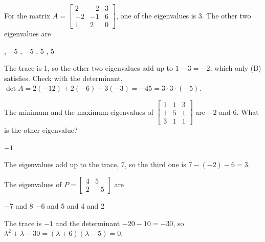\begin{question}[id=gate-ce2006-2, source=GATE CE 2006, marks=2]
For the matrix $A = \begin{bmatrix} 2 & -2 & 3 \\ -2 & -1 & 6 \\ 1 & 2 & 0 \end{bmatrix}$, one of the eigenvalues is 3. The other two eigenvalues are
\begin{options}
  , $-5$
  , $-5$
  , 5
  , 5
\end{options}
\begin{solution}
The trace is 1, so the other two eigenvalues add up to $1 - 3 = -2$, which only (B) satisfies. Check with the determinant, $\det A = 2(-12) + 2(-6) + 3(-3) = -45 = 3 \cdot 3 \cdot (-5)$.
\end{solution}
\end{question}

\begin{question}[id=gate-ce2007-3, source=GATE CE 2007]
The minimum and the maximum eigenvalues of $\begin{bmatrix} 1 & 1 & 3 \\ 1 & 5 & 1 \\ 3 & 1 & 1 \end{bmatrix}$ are $-2$ and 6. What is the other eigenvalue?
\begin{options}
  \option $-1$
\end{options}
\begin{solution}
The eigenvalues add up to the trace, 7, so the third one is $7 - (-2) - 6 = 3$.
\end{solution}
\end{question}

\begin{question}[id=gate-ce2008-3, source=GATE CE 2008]
The eigenvalues of $P = \begin{bmatrix} 4 & 5 \\ 2 & -5 \end{bmatrix}$ are
\begin{options}
  \option $-7$ and 8
  \correct $-6$ and 5
   and 4
   and 2
\end{options}
\begin{solution}
The trace is $-1$ and the determinant $-20 - 10 = -30$, so $\lambda^2 + \lambda - 30 = (\lambda + 6)(\lambda - 5) = 0$.
\end{solution}
\end{question}

